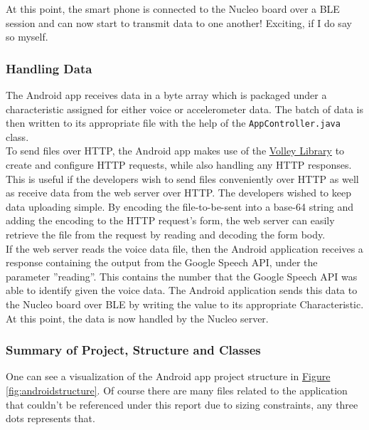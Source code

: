 At this point, the smart phone is connected to the Nucleo board over a BLE session and can now start to transmit data to one another! Exciting, if I do say so myself.

\subsubsection{Handling Data}

The Android app receives data in a byte array which is packaged under a characteristic assigned for either voice or accelerometer data. The batch of data is then written to its appropriate file with the help of the \texttt{AppController.java} class.\\

To send files over HTTP, the Android app makes use of the \href{https://developer.android.com/training/volley/index.html}{Volley Library} to create and configure HTTP requests, while also handling any HTTP responses. This is useful if the developers wish to send files conveniently over HTTP as well as receive data from the web server over HTTP. The developers wished to keep data uploading simple. By encoding the file-to-be-sent into a base-64 string and adding the encoding to the HTTP request's form, the web server can easily retrieve the file from the request by reading and decoding the form body.\\

If the web server reads the voice data file, then the Android application receives a response containing the output from the Google Speech API, under the parameter ''reading''. This contains the number that the Google Speech API was able to identify given the voice data. The Android application sends this data to the Nucleo board over BLE by writing the value to its appropriate Characteristic. At this point, the data is now handled by the Nucleo server.

\subsubsection{Summary of Project, Structure and Classes}

One can see a visualization of the Android app project structure in
\hyperref[fig:androidstructure]{Figure \ref{fig:androidstructure}}. Of course there are many files related to the application that couldn't be referenced under this report due to sizing constraints, any three dots represents that.\\

